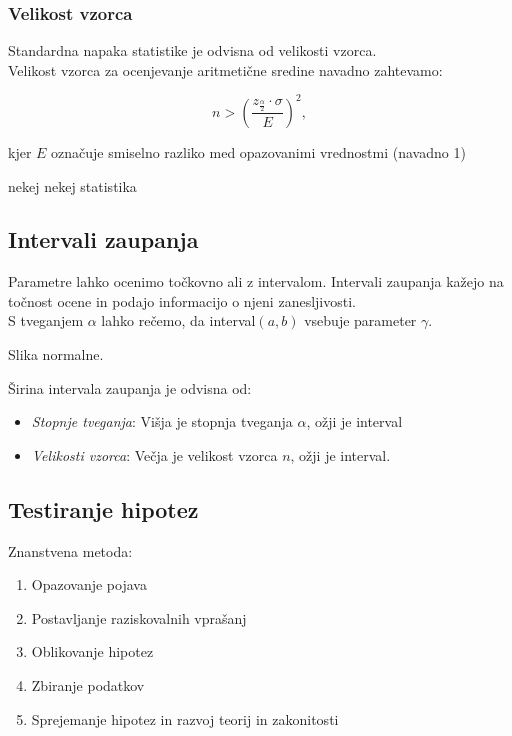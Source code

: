 \subsubsection*{Velikost vzorca}

Standardna napaka statistike je odvisna od velikosti vzorca.\\

Velikost vzorca za ocenjevanje aritmetične sredine navadno zahtevamo:

\[n>\left(\frac{z_{\frac{\alpha}{2}}\cdot\sigma}{E}\right)^2,\]

kjer $E$ označuje smiselno razliko med opazovanimi vrednostmi (navadno 1)

nekej nekej statistika

\subsection*{Intervali zaupanja}

Parametre lahko ocenimo točkovno ali z intervalom. Intervali zaupanja kažejo na točnost ocene in podajo informacijo o njeni zanesljivosti.\\
S tveganjem $\alpha$ lahko rečemo, da interval$(a,b)$ vsebuje parameter $\gamma$.

Slika normalne.

Širina intervala zaupanja je odvisna od:
\begin{itemize}
    \item \textit{Stopnje tveganja}: Višja je stopnja tveganja $\alpha$, ožji je interval
    \item \textit{Velikosti vzorca}: Večja je velikost vzorca $n$, ožji je interval.
\end{itemize}

\subsection*{Testiranje hipotez}

Znanstvena metoda:
\begin{enumerate}
    \item Opazovanje pojava
    \item Postavljanje raziskovalnih vprašanj
    \item Oblikovanje hipotez
    \item Zbiranje podatkov
    \item Sprejemanje hipotez in razvoj teorij in zakonitosti
\end{enumerate}

